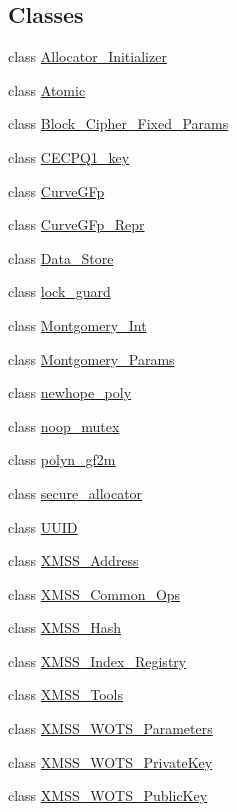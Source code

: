 \subsection*{Classes}
\begin{DoxyCompactItemize}
\item 
class \hyperlink{class_botan_1_1_allocator___initializer}{Allocator\+\_\+\+Initializer}
\item 
class \hyperlink{class_botan_1_1_atomic}{Atomic}
\item 
class \hyperlink{class_botan_1_1_block___cipher___fixed___params}{Block\+\_\+\+Cipher\+\_\+\+Fixed\+\_\+\+Params}
\item 
class \hyperlink{class_botan_1_1_c_e_c_p_q1__key}{C\+E\+C\+P\+Q1\+\_\+key}
\item 
class \hyperlink{class_botan_1_1_curve_g_fp}{Curve\+G\+Fp}
\item 
class \hyperlink{class_botan_1_1_curve_g_fp___repr}{Curve\+G\+Fp\+\_\+\+Repr}
\item 
class \hyperlink{class_botan_1_1_data___store}{Data\+\_\+\+Store}
\item 
class \hyperlink{class_botan_1_1lock__guard}{lock\+\_\+guard}
\item 
class \hyperlink{class_botan_1_1_montgomery___int}{Montgomery\+\_\+\+Int}
\item 
class \hyperlink{class_botan_1_1_montgomery___params}{Montgomery\+\_\+\+Params}
\item 
class \hyperlink{class_botan_1_1newhope__poly}{newhope\+\_\+poly}
\item 
class \hyperlink{class_botan_1_1noop__mutex}{noop\+\_\+mutex}
\item 
class \hyperlink{class_botan_1_1polyn__gf2m}{polyn\+\_\+gf2m}
\item 
class \hyperlink{class_botan_1_1secure__allocator}{secure\+\_\+allocator}
\item 
class \hyperlink{class_botan_1_1_u_u_i_d}{U\+U\+ID}
\item 
class \hyperlink{class_botan_1_1_x_m_s_s___address}{X\+M\+S\+S\+\_\+\+Address}
\item 
class \hyperlink{class_botan_1_1_x_m_s_s___common___ops}{X\+M\+S\+S\+\_\+\+Common\+\_\+\+Ops}
\item 
class \hyperlink{class_botan_1_1_x_m_s_s___hash}{X\+M\+S\+S\+\_\+\+Hash}
\item 
class \hyperlink{class_botan_1_1_x_m_s_s___index___registry}{X\+M\+S\+S\+\_\+\+Index\+\_\+\+Registry}
\item 
class \hyperlink{class_botan_1_1_x_m_s_s___tools}{X\+M\+S\+S\+\_\+\+Tools}
\item 
class \hyperlink{class_botan_1_1_x_m_s_s___w_o_t_s___parameters}{X\+M\+S\+S\+\_\+\+W\+O\+T\+S\+\_\+\+Parameters}
\item 
class \hyperlink{class_botan_1_1_x_m_s_s___w_o_t_s___private_key}{X\+M\+S\+S\+\_\+\+W\+O\+T\+S\+\_\+\+Private\+Key}
\item 
class \hyperlink{class_botan_1_1_x_m_s_s___w_o_t_s___public_key}{X\+M\+S\+S\+\_\+\+W\+O\+T\+S\+\_\+\+Public\+Key}
\end{DoxyCompactItemize}
